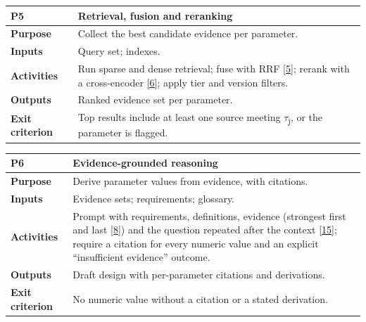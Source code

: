 \documentclass[11pt,a4paper]{article}
\begin{document}
\vspace{-2pt}
{\small
\begin{longtable}{>{\raggedright\arraybackslash}p{}>{\raggedright\arraybackslash}p{}}
\toprule
\rowcolor{headbg} \textbf{P5} & \textbf{Retrieval, fusion and reranking} \\
\midrule
\endfirsthead
\bottomrule
\endlastfoot
\textbf{Purpose} & Collect the best candidate evidence per parameter. \\ \arrayrulecolor{rulec}\hline\arrayrulecolor{black}
\textbf{Inputs} & Query set; indexes. \\ \arrayrulecolor{rulec}\hline\arrayrulecolor{black}
\textbf{Activities} & Run sparse and dense retrieval; fuse with RRF \hyperlink{ref5}{[5]}; rerank with a cross-encoder \hyperlink{ref6}{[6]}; apply tier and version filters. \\ \arrayrulecolor{rulec}\hline\arrayrulecolor{black}
\textbf{Outputs} & Ranked evidence set per parameter. \\ \arrayrulecolor{rulec}\hline\arrayrulecolor{black}
\textbf{Exit criterion} & Top results include at least one source meeting \ensuremath{\tau}\textsubscript{j}, or the parameter is flagged. \\
\end{longtable}
}
\vspace{-2pt}
{\small
\begin{longtable}{>{\raggedright\arraybackslash}p{}>{\raggedright\arraybackslash}p{}}
\toprule
\rowcolor{headbg} \textbf{P6} & \textbf{Evidence-grounded reasoning} \\
\midrule
\endfirsthead
\bottomrule
\endlastfoot
\textbf{Purpose} & Derive parameter values from evidence, with citations. \\ \arrayrulecolor{rulec}\hline\arrayrulecolor{black}
\textbf{Inputs} & Evidence sets; requirements; glossary. \\ \arrayrulecolor{rulec}\hline\arrayrulecolor{black}
\textbf{Activities} & Prompt with requirements, definitions, evidence (strongest first and last \hyperlink{ref8}{[8]}) and the question repeated after the context \hyperlink{ref15}{[15]}; require a citation for every numeric value and an explicit ``insufficient evidence'' outcome. \\ \arrayrulecolor{rulec}\hline\arrayrulecolor{black}
\textbf{Outputs} & Draft design with per-parameter citations and derivations. \\ \arrayrulecolor{rulec}\hline\arrayrulecolor{black}
\textbf{Exit criterion} & No numeric value without a citation or a stated derivation. \\
\end{longtable}
}
\end{document}
